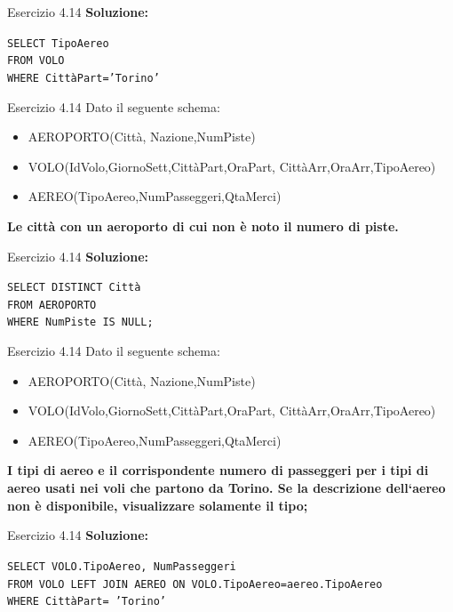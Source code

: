 \begin{frame}{Esercizio 4.14}
    \textbf{Soluzione:}
    \vspace{1em}
    
    \texttt{SELECT TipoAereo\\FROM VOLO\\WHERE Citt\`aPart='Torino'}
    \end{frame}
\begin{frame}{Esercizio 4.14}
    Dato il seguente schema:
    \begin{itemize}
        \item AEROPORTO(Citt\`a, Nazione,NumPiste)
        \item VOLO(IdVolo,GiornoSett,Citt\`aPart,OraPart,
        Citt\`aArr,OraArr,TipoAereo)
        \item AEREO(TipoAereo,NumPasseggeri,QtaMerci)
    \end{itemize}
    \vspace{1em}
    
    \textbf{Le citt\`a con un aeroporto di cui non \`e noto il numero di piste.}
\end{frame}

\begin{frame}{Esercizio 4.14}
    \textbf{Soluzione:}
    \vspace{1em}
    
    \texttt{SELECT DISTINCT Citt\`a\\FROM AEROPORTO\\WHERE NumPiste IS NULL;}
    \end{frame}
\begin{frame}{Esercizio 4.14}
    Dato il seguente schema:
    \begin{itemize}
        \item AEROPORTO(Citt\`a, Nazione,NumPiste)
        \item VOLO(IdVolo,GiornoSett,Citt\`aPart,OraPart,
        Citt\`aArr,OraArr,TipoAereo)
        \item AEREO(TipoAereo,NumPasseggeri,QtaMerci)
    \end{itemize}
    \vspace{1em}
    
    \textbf{I tipi di aereo e il corrispondente numero di passeggeri per i tipi di aereo usati nei voli che partono da Torino. Se la descrizione dell`aereo non \`e disponibile, visualizzare solamente il tipo;}
\end{frame}

\begin{frame}{Esercizio 4.14}
    \textbf{Soluzione:}
    \vspace{1em}
    
    \texttt{SELECT VOLO.TipoAereo, NumPasseggeri\\FROM VOLO LEFT JOIN AEREO ON VOLO.TipoAereo=aereo.TipoAereo\\WHERE Citt\`aPart= 'Torino'}
    \end{frame}
